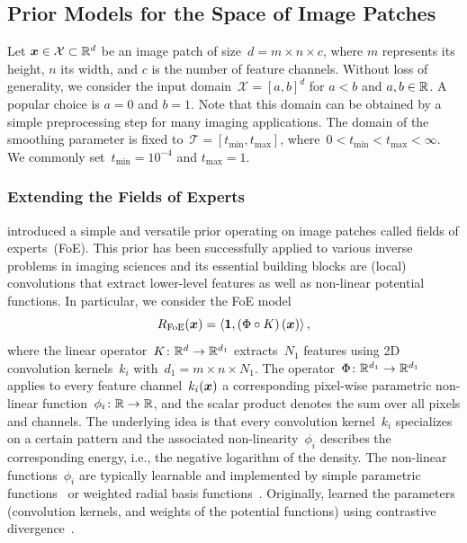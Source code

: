 \documentclass[nohyperref]{article}
\newcommand{\X}{\mathcal{X}}
\newcommand{\T}{\mathcal{T}}
\newcommand{\scal}[2]{\left\langle#1,#2\right\rangle}
\renewcommand{\vec}[1]{\mathbf{#1}}
\newcommand{\tmin}{t_\mathrm{min}}
\newcommand{\tmax}{t_\mathrm{max}}
\theoremstyle{plain}
\theoremstyle{definition}
\theoremstyle{remark}
\begin{document}
\subsection{Prior Models for the Space of Image Patches}
Let $\vx\in\X\subset\R^d$ be an image patch of size~$d=m\times n\times c$, where $m$ represents its height, $n$ its width, and $c$ is the number of feature channels.
Without loss of generality, we consider the input domain~$\X=[a,b]^d$ for $a<b$ and $a,b\in\mathbb{R}$.
A popular choice is $a=0$ and $b=1$.
Note that this domain can be obtained by a simple preprocessing step for many imaging applications.
The domain of the smoothing parameter is fixed to~$\T=[\tmin,\tmax]$, where~$0<\tmin<\tmax<\infty$.
We commonly set~$\tmin=10^{-4}$ and $\tmax=1$.

\subsubsection{Extending the Fields of Experts}
\citet{RoBl09} introduced a simple and versatile prior operating on image patches called fields of experts~(FoE).
This prior has been successfully applied to various inverse problems in imaging sciences and its essential building blocks are (local) convolutions that extract lower-level features as well as non-linear potential functions.
In particular, we consider the FoE model
\[
R_\mathrm{FoE}(\vx) = \scal{\vec{1}}{\left(\Phi \circ K\right)(\vx)},
\]
where the linear operator~$K\colon\mathbb{R}^d\to\mathbb{R}^{d_1}$ extracts~$N_1$ features using 2D convolution kernels~$k_i$ with~$d_1=m\times n\times N_1$.
The operator~$\Phi\colon\mathbb{R}^{d_1}\to\mathbb{R}^{d_1}$ applies to every feature channel~$k_i({\bm{x}})$ a corresponding pixel-wise parametric non-linear function~$\phi_i\colon\mathbb{R}\to\mathbb{R}$, and the scalar product denotes the sum over all pixels and channels.
The underlying idea is that every convolution kernel~$k_i$ specializes on a certain pattern and the associated non-linearity~$\phi_i$ describes the corresponding energy, i.e., the negative logarithm of the density.
The non-linear functions~$\phi_i$ are typically learnable and implemented by simple parametric functions~\citep{RoBl09,ChRa14} or weighted radial basis functions~\citep{ChPo16,KoKl17}.
Originally, \citet{RoBl09} learned the parameters (convolution kernels, and weights of the potential functions) using contrastive divergence~\citep{Hi02}.
\end{document}
